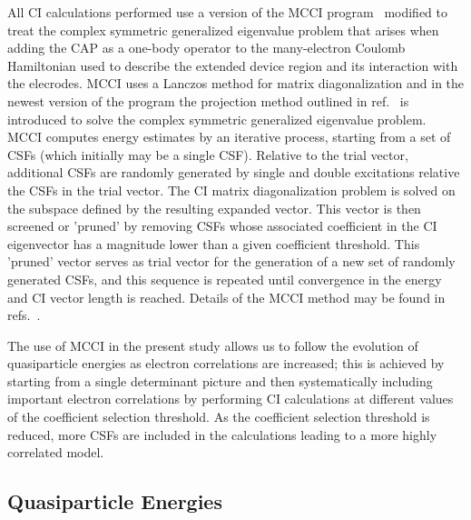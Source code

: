 All \ac{CI} calculations  performed use a version of the \ac{MCCI}
program~\cite{mcci1995, mcci1998} modified to treat the complex
symmetric generalized eigenvalue problem that arises when adding the
\ac{CAP} as a one-body operator to the many-electron Coulomb
Hamiltonian used to describe the extended device region and its
interaction with the elecrodes. \ac{MCCI} uses a Lanczos method for
matrix diagonalization and in the newest version of the program the
projection method outlined in ref.~\cite{tarantelli_csd} is introduced to
solve the complex symmetric generalized eigenvalue problem. \ac{MCCI}
computes energy estimates by an iterative process, starting from a set
of \acp{CSF} (which initially may be a single \ac{CSF}).
Relative to the trial vector, additional \acp{CSF} are randomly
generated by single and double excitations relative the \acp{CSF} in the
trial vector. The \ac{CI} matrix diagonalization problem is solved on
the subspace defined by the resulting expanded vector. This vector is
then screened or 'pruned' by removing \acp{CSF} whose associated coefficient
in the \ac{CI} eigenvector has a magnitude lower than a given coefficient
threshold. This 'pruned' vector serves as trial vector for the generation of
a new set of randomly generated \acp{CSF}, and this sequence is repeated until
convergence in the energy and CI vector length is reached. Details of the
\ac{MCCI} method may be found in refs.~\cite{mcci1995,mcci1998,mcci2000,multiref}.

The use of \ac{MCCI} in the present study allows us to follow the
evolution of quasiparticle energies as electron correlations are
increased; this is achieved by starting from a single determinant picture
and then systematically including important electron correlations by
performing \ac{CI} calculations at different values of the coefficient
selection threshold. As the coefficient selection threshold is reduced,
more \acp{CSF} are included in the calculations leading to a more highly
correlated model.

\subsection{Quasiparticle Energies}


